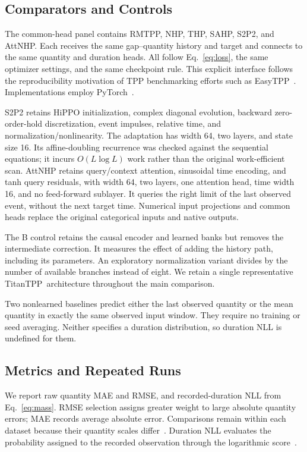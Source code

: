 \documentclass[runningheads]{llncs}
\newcommand{\method}{TitanTPP}
\begin{document}
\subsection{Comparators and Controls}
The common-head panel contains RMTPP, NHP, THP, SAHP, S2P2, and AttNHP.
Each receives the same gap--quantity history and target and connects to the
same quantity and duration heads. All follow Eq.~\eqref{eq:loss}, the same
optimizer settings, and the same checkpoint rule. This explicit interface
follows the reproducibility motivation of TPP benchmarking efforts such as
EasyTPP~\cite{xue2024easytpp}. Implementations employ
PyTorch~\cite{paszke2019pytorch}.

S2P2 retains HiPPO initialization, complex diagonal evolution, backward
zero-order-hold discretization, event impulses, relative time, and
normalization/nonlinearity. The adaptation has width 64, two layers, and
state size 16. Its affine-doubling recurrence was checked against the
sequential equations; it incurs $O(L\log L)$ work rather than the original
work-efficient scan. AttNHP retains query/context attention, sinusoidal time
encoding, and tanh query residuals, with width 64, two layers, one attention
head, time width 16, and no feed-forward sublayer. It queries the right limit
of the last observed event, without the next target time. Numerical input
projections and common heads replace the original categorical inputs and
native outputs.

The B control retains the causal encoder and learned banks but removes the
intermediate correction. It measures the effect of adding the history path,
including its parameters. An exploratory normalization variant divides by
the number of available branches instead of eight. We retain a single
representative \method\ architecture throughout the main comparison.

Two nonlearned baselines predict either the last observed quantity or the
mean quantity in exactly the same observed input window. They require no
training or seed averaging. Neither specifies a duration distribution, so
duration NLL is undefined for them.

\subsection{Metrics and Repeated Runs}
We report raw quantity MAE and RMSE, and recorded-duration NLL from
Eq.~\eqref{eq:mass}. RMSE selection assigns greater weight to large absolute
quantity errors; MAE records average absolute error. Comparisons remain
within each dataset because their quantity scales differ~\cite{hyndman2006accuracy}.
Duration NLL evaluates the probability assigned to the recorded observation
through the logarithmic score~\cite{gneiting2007proper}.
\end{document}
